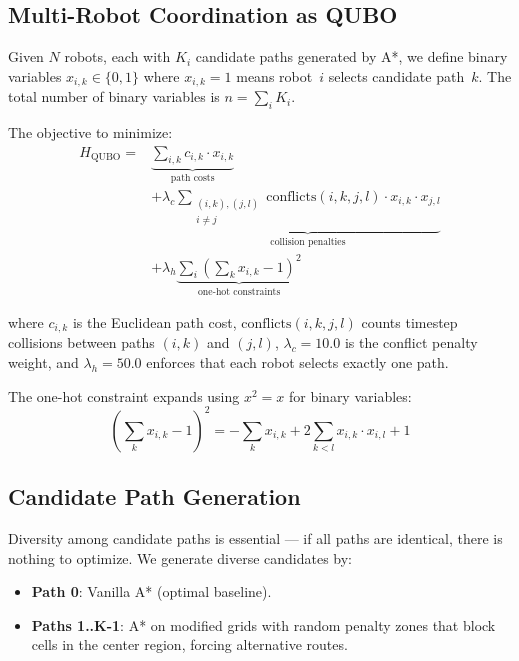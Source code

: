\documentclass[conference]{IEEEtran}
\begin{document}
\subsection{Multi-Robot Coordination as QUBO}

Given $N$ robots, each with $K_i$ candidate paths generated by A*, we define binary variables $x_{i,k} \in \{0,1\}$ where $x_{i,k} = 1$ means robot~$i$ selects candidate path~$k$. The total number of binary variables is $n = \sum_i K_i$.

The objective to minimize:
\begin{equation}
\begin{split}
    H_{\text{QUBO}} = & \underbrace{\sum_{i,k} c_{i,k} \cdot x_{i,k}}_{\text{path costs}} \\
    & + \lambda_c \underbrace{\sum_{\substack{(i,k),(j,l) \\ i \neq j}} \text{conflicts}(i,k,j,l) \cdot x_{i,k} \cdot x_{j,l}}_{\text{collision penalties}} \\
    & + \lambda_h \underbrace{\sum_{i} \left(\sum_{k} x_{i,k} - 1\right)^2}_{\text{one-hot constraints}}
\end{split}
\end{equation}

where $c_{i,k}$ is the Euclidean path cost, $\text{conflicts}(i,k,j,l)$ counts timestep collisions between paths $(i,k)$ and $(j,l)$, $\lambda_c = 10.0$ is the conflict penalty weight, and $\lambda_h = 50.0$ enforces that each robot selects exactly one path.

The one-hot constraint expands using $x^2 = x$ for binary variables:
\begin{equation}
    \left(\sum_k x_{i,k} - 1\right)^2 = -\sum_k x_{i,k} + 2\sum_{k < l} x_{i,k} \cdot x_{i,l} + 1
\end{equation}

\subsection{Candidate Path Generation}

Diversity among candidate paths is essential --- if all paths are identical, there is nothing to optimize. We generate diverse candidates by:

\begin{itemize}
    \item \textbf{Path 0}: Vanilla A* (optimal baseline).
    \item \textbf{Paths 1..K-1}: A* on modified grids with random penalty zones that block cells in the center region, forcing alternative routes.
\end{itemize}
\end{document}
